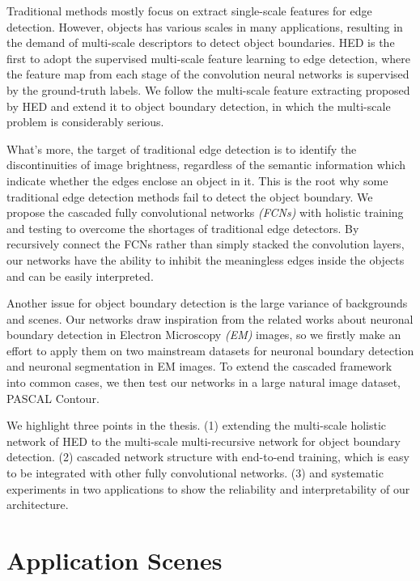 \documentclass[senior]{IPSstyle}
\begin{document}
Traditional methods mostly focus on extract single-scale features for edge detection\cite{Canny1986, Sobel2014, Dollar2013, Shen2015}. However, objects has various scales in many applications, resulting in the demand of multi-scale descriptors to detect object boundaries. HED\cite{Xie2015} is the first to adopt the supervised multi-scale feature learning to edge detection, where the feature map from each stage of the convolution neural networks is supervised by the ground-truth labels. We follow the multi-scale feature extracting proposed by HED\cite{Xie2015} and extend it to object boundary detection, in which the multi-scale problem is considerably serious.

What's more, the target of traditional edge detection is to identify the discontinuities of image brightness, regardless of the semantic information which indicate whether the edges enclose an object in it. This is the root why some traditional edge detection methods fail to detect the object boundary. We propose the cascaded fully convolutional networks \emph{(FCNs)}\cite{Long2015} with holistic training and testing to overcome the shortages of traditional edge detectors. By recursively connect the FCNs rather than simply stacked the convolution layers, our networks have the ability to inhibit the meaningless edges inside the objects and can be easily interpreted.

Another issue for object boundary detection is the large variance of backgrounds and scenes. Our networks draw inspiration from the related works about neuronal boundary detection in Electron Microscopy \emph{(EM)} images, so we firstly make an effort to apply them on two mainstream datasets for neuronal boundary detection and neuronal segmentation in EM images. To extend the cascaded framework into common cases, we then test our networks in a large natural image dataset, PASCAL Contour\cite{Yang2016}.

We highlight three points in the thesis. (1) extending the multi-scale holistic network of HED\cite{Xie2015} to the multi-scale multi-recursive network for object boundary detection. (2) cascaded network structure with end-to-end training, which is easy to be integrated with other fully convolutional networks. (3) and systematic experiments in two applications to show the reliability and interpretability of our architecture.




\section{Application Scenes}
\end{document}
